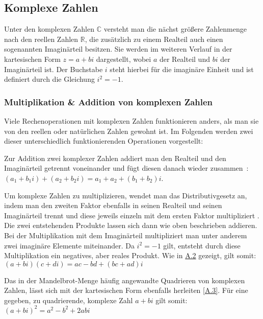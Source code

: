 \subsection{Komplexe Zahlen}\label{subsec:complex-numbers}

Unter den komplexen Zahlen $\mathbb{C}$ versteht man die nächst größere Zahlenmenge
nach den reellen Zahlen $\mathbb{R}$,
die zus\"atzlich zu einem Realteil auch einen sogenannten Imagin\"arteil besitzen.
Sie werden im weiteren Verlauf in der kartesischen Form
$z = a + bi$ dargestellt, wobei $a$ der Realteil und $bi$ der Imagin\"arteil ist.
Der Buchstabe $i$ steht hierbei für die imaginäre Einheit und
ist definiert durch die Gleichung $i^2 = -1$.

\subsubsection{Multiplikation \& Addition von komplexen Zahlen}
\label{subsubsec:addition-and-multiplication-of-complex-numbers}

Viele Rechenoperationen mit komplexen Zahlen funktionieren anders, als man sie
von den reellen oder natürlichen Zahlen gewohnt ist.
Im Folgenden werden zwei dieser unterschiedlich funktionierenden
Operationen vorgestellt:

Zur Addition zwei komplexer Zahlen addiert man den
Realteil und den Imagin\"arteil getrennt voneinander und fügt diesen
danach wieder zusammen~\cite[S. 2]{lichtenegger_komplexe_2002}:
$(a_1 + {b_1}i) + (a_2 + {b_2}i) = a_1 + a_2 + (b_1 + b_2)i$.

Um komplexe Zahlen zu multiplizieren, wendet man das Distributivgesetz an,
indem man den zweiten Faktor ebenfalls in seinen Realteil und seinen
Imagin\"arteil trennt und diese jeweils einzeln mit dem ersten Faktor multipliziert
\cite[S. 2f.]{lichtenegger_komplexe_2002}.
Die zwei entstehenden Produkte lassen sich dann wie oben beschrieben addieren.
Bei der Multiplikation mit dem Imagin\"arteil multipliziert man unter anderem
zwei imagin\"are Elemente miteinander.
Da $i^2 = -1$ gilt, entsteht durch diese Multiplikation
ein negatives, aber reales Produkt.
Wie in \hyperref[app:2]{A.2} gezeigt, gilt somit:
$ (a + bi)(c + di) = ac - bd + (bc + ad)i $

Das in der Mandelbrot-Menge häufig angewandte Quadrieren von komplexen Zahlen,
lässt sich mit der kartesischen Form ebenfalls herleiten \hyperref[app:3]{[A.3]}.
Für eine gegeben, zu quadrierende, komplexe Zahl $a + bi$ gilt somit:
$(a + bi)^2 = a^2 - b^2 + 2abi$


